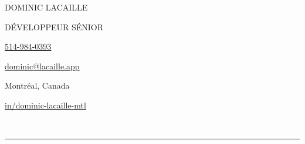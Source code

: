 \documentclass{article}
\begin{document}

\thispagestyle{empty}

\noindent
\begin{minipage}{12cm}
  \vspace{0.5em}
  {\fontsize{33}{33}\noindent\selectfont\uppercase{Dominic Lacaille}\par}
  \vspace{1em}
  {\noindent\large\trackingwide\uppercase{Développeur Sénior}\par}
\end{minipage}
\hfill
\begin{minipage}[m]{4.5cm}
  {\faPhone*\hspace{1.5em}\href{tel:15149840393}{514-984-0393}\par}
  \vspace{0.3em}
  {\faEnvelope\hspace{1.5em}\href{mailto:dominic@lacaille.app}{dominic@lacaille.app}\par}
  \vspace{0.3em}
  {\faCanadianMapleLeaf\hspace{1.5em}Montréal, Canada\par}
  \vspace{0.3em}
  {\faLinkedin\hspace{1.5em}\href{https://linkedin.com/in/dominic-lacaille-mtl}{in/dominic-lacaille-mtl}\par}
\end{minipage}

\

\par\noindent\rule{\textwidth}{0.4pt}

\vspace{3em}
\end{document}
